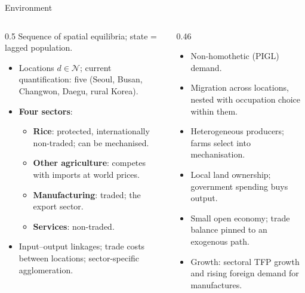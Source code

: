 \documentclass[10pt,aspectratio=169]{beamer}
\begin{document}
\begin{frame}{Environment}
  \begin{columns}[T]
    \begin{column}{0.5\textwidth}
      \small
      Sequence of spatial equilibria; state = lagged population.
      \begin{itemize}
        \item Locations $d\in\mathcal N$; current quantification: five (Seoul, Busan,
              Changwon, Daegu, rural Korea).
        \item \textbf{Four sectors}:
          \begin{itemize}\footnotesize
            \item \textbf{Rice}: protected, internationally non-traded; can be mechanised.
            \item \textbf{Other agriculture}: competes with imports at world prices.
            \item \textbf{Manufacturing}: traded; the export sector.
            \item \textbf{Services}: non-traded.
          \end{itemize}
        \item Input--output linkages; trade costs between locations; sector-specific
              agglomeration.
      \end{itemize}
    \end{column}
    \begin{column}{0.46\textwidth}
      \small
      \begin{itemize}
        \item Non-homothetic (PIGL) demand.
        \item Migration across locations, nested with occupation choice within them.
        \item Heterogeneous producers; farms select into mechanisation.
        \item Local land ownership; government spending buys output.
        \item Small open economy; trade balance pinned to an exogenous path.
        \item Growth: sectoral TFP growth and rising foreign demand for manufactures.
      \end{itemize}
    \end{column}
  \end{columns}
\end{frame}
\end{document}

